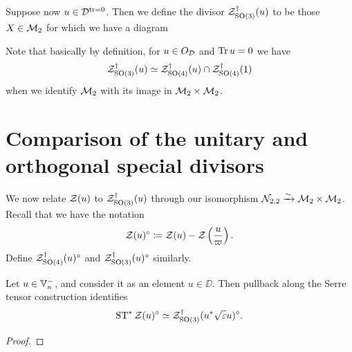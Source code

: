 \begin{definition}
  Suppose now $u \in \mathcal D^{\operatorname{tr} = 0}$.
  Then we define the divisor $\mathcal Z^{\dagger}_{\operatorname{SO}(3)}(u)$ to be those $X \in \mathcal M_2$
  for which we have a diagram
  \begin{center}
  \end{center}
  Note that basically by definition, for $u \in O_\mathcal D$ and $\operatorname{Tr} u = 0$ we have
  \[ \mathcal Z^{\dagger}_{\operatorname{SO}(3)}(u) \simeq \mathcal Z^{\dagger}_{\operatorname{SO}(4)}(u) \cap \mathcal Z^{\dagger}_{\operatorname{SO}(4)}(1) \]
  when we identify $\mathcal M_2$ with its image in $\mathcal M_2 \times \mathcal M_2$.
\end{definition}

\section{Comparison of the unitary and orthogonal special divisors}
We now relate $\mathcal Z(u)$ to $\mathcal Z^{\dagger}_{\operatorname{SO}(3)}(u)$ through our
isomorphism $\mathcal N_{2,2} \xrightarrow{\sim} \mathcal M_2 \times \mathcal M_2$.
Recall that we have the notation
\[ \mathcal Z(u)^\circ \coloneqq \mathcal Z(u) - \mathcal Z\left( \frac{u}{\varpi} \right). \]
Define $\mathcal Z^{\dagger}_{\operatorname{SO}(4)}(u)^\circ$ and $\mathcal Z^{\dagger}_{\operatorname{SO}(3)}(u)^\circ$ similarly.

\begin{lemma}
  Let $u \in \mathbb V_n^-$, and consider it as an element $u \in \DD$.
  Then pullback along the Serre tensor construction identifies
  \[ \operatorname{ST}^\ast \mathcal Z(u)^\circ \simeq \mathcal Z^{\dagger}_{\operatorname{SO}(3)}(u^\ast \sqrt{\varepsilon} u)^\circ. \]
\end{lemma}
\begin{proof}
\end{proof}

